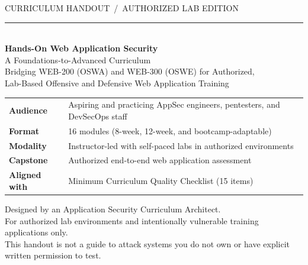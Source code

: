 \documentclass[11pt,letterpaper,oneside]{report}
\begin{document}
\begin{titlepage}
  \pagecolor{afpaper}
  \vspace*{1.6cm}
  {\sffamily\color{afsteel}\large CURRICULUM HANDOUT \,/\, AUTHORIZED LAB EDITION}\\[2pt]
  {\color{afsteel}\rule{\linewidth}{0.4pt}}\\[1.4cm]
  {\sffamily\bfseries\color{afnavy}\fontsize{30}{34}\selectfont
   Hands-On Web Application Security}\\[10pt]
  {\sffamily\color{afteal}\Large A Foundations-to-Advanced Curriculum}\\[6pt]
  {\sffamily\color{afsteel}\large Bridging WEB-200 (OSWA) and WEB-300 (OSWE) for Authorized,\\
   Lab-Based Offensive and Defensive Web Application Training}\\[2.4cm]
  {\sffamily\color{afnavy}\large
    \begin{tabular}{@{}ll@{}}
      \textbf{Audience}      & Aspiring and practicing AppSec engineers, pentesters, and DevSecOps staff\\
      \textbf{Format}        & 16 modules (8-week, 12-week, and bootcamp-adaptable)\\
      \textbf{Modality}      & Instructor-led with self-paced labs in authorized environments\\
      \textbf{Capstone}      & Authorized end-to-end web application assessment\\
      \textbf{Aligned with}  & Minimum Curriculum Quality Checklist (15 items)\\
    \end{tabular}}
  \vfill
  {\sffamily\color{afsteel}\small
   Designed by an Application Security Curriculum Architect.\\
   For authorized lab environments and intentionally vulnerable training applications only.\\
   This handout is not a guide to attack systems you do not own or have explicit written permission to test.}
  \nopagecolor
\end{titlepage}

\setcounter{page}{2}
\end{document}
